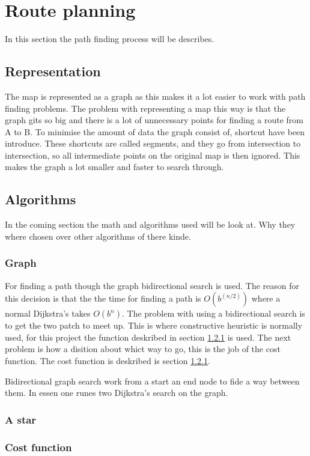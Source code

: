 \section{Route planning}
In this section the path finding process will be describes.

\subsection{Representation}
The map is represented as a graph as this makes it a lot easier to work with path finding problems. The problem with representing a map this way is that the graph gits so big and there is a lot of unnecessary points for finding a route from A to B. To minimise the amount of data the graph consist of, shortcut have been introduce. These shortcuts are called segments, and they go from intersection to intersection, so all intermediate points on the original map is then ignored. This makes the graph a lot smaller and faster to search through.

\subsection{Algorithms} \label{algorithms}
In the coming section the math and algorithms used will be look at. Why they where chosen over other algorithms of there kinde.

\subsubsection{Graph}\label{graph}
For finding a path though the graph bidirectional search is used. The reason for this decision is that the the time for finding a path is $O(b^{(n/2)})$ where a normal Dijkstra’s takes $O(b^{n})$. The problem with using a bidirectional search is to get the two patch to meet up. This is where constructive heuristic is normally used, for this project the function deskribed in section \ref{graph} is used. The next problem is how a disition about whict way to go, this is the job of the cost function. The cost function is deskribed is section \ref{graph}.

Bidirectional graph search work from a start an end node to fide a way between them. In essen one runes two Dijkstra's search on the graph.

\subsubsection{A star} \label{}


\subsubsection{Cost function} \label{}
